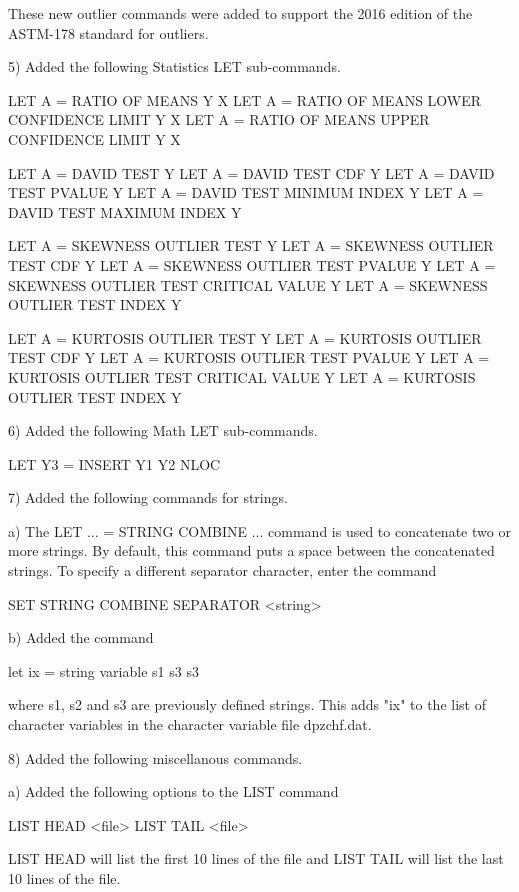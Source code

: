        These new outlier commands were added to support the
       2016 edition of the ASTM-178 standard for outliers.

 5) Added the following Statistics LET sub-commands.

      LET A = RATIO OF MEANS Y X
      LET A = RATIO OF MEANS LOWER CONFIDENCE LIMIT Y X
      LET A = RATIO OF MEANS UPPER CONFIDENCE LIMIT Y X

      LET A = DAVID TEST Y
      LET A = DAVID TEST CDF Y
      LET A = DAVID TEST PVALUE Y
      LET A = DAVID TEST MINIMUM INDEX Y
      LET A = DAVID TEST MAXIMUM INDEX Y

      LET A = SKEWNESS OUTLIER TEST Y
      LET A = SKEWNESS OUTLIER TEST CDF Y
      LET A = SKEWNESS OUTLIER TEST PVALUE Y
      LET A = SKEWNESS OUTLIER TEST CRITICAL VALUE Y
      LET A = SKEWNESS OUTLIER TEST INDEX Y

      LET A = KURTOSIS OUTLIER TEST Y
      LET A = KURTOSIS OUTLIER TEST CDF Y
      LET A = KURTOSIS OUTLIER TEST PVALUE Y
      LET A = KURTOSIS OUTLIER TEST CRITICAL VALUE Y
      LET A = KURTOSIS OUTLIER TEST INDEX Y

 6) Added the following Math LET sub-commands.

      LET Y3 = INSERT Y1 Y2 NLOC

 7) Added the following commands for strings.

    a) The LET ... = STRING COMBINE ... command is used to concatenate 
       two or more strings.  By default, this command puts a space
       between the concatenated strings.  To specify a different 
       separator character, enter the command

           SET STRING COMBINE SEPARATOR <string>

    b) Added the command

          let ix = string variable s1 s3 s3

       where s1, s2 and s3 are previously defined strings.  This adds
       "ix" to the list of character variables in the character variable
       file dpzchf.dat.

 8) Added the following miscellanous commands.

    a) Added the following options to the LIST command

          LIST HEAD <file>
          LIST TAIL <file>

       LIST HEAD will list the first 10 lines of the file and LIST TAIL
       will list the last 10 lines of the file.

